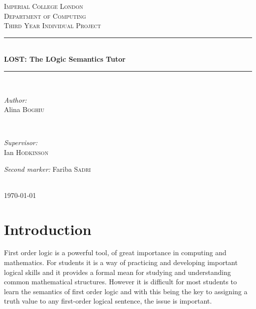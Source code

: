 \documentclass{article}
\begin{document}

\begin{titlepage}
\newcommand{\HRule}{\rule{\linewidth}{0.5mm}}
\center
\textsc{\LARGE Imperial College London}  \\[1.5cm]
\textsc{\Large Department of Computing}  \\[0.5cm]
\textsc{\large Third Year Individual Project} \\[0.5cm]

\HRule \\[0.6cm]
{\huge \bfseries LOST: The LOgic Semantics Tutor} \\[0.3cm]
\HRule \\[1.5cm]

\begin{minipage}{0.4\textwidth}

\begin{flushleft} \large \emph{Author:} \\
Alina  \textsc{Boghiu}
\end{flushleft}

\end{minipage}~
\begin{minipage}{0.4\textwidth}

\begin{flushright} \large \emph{Supervisor:} \\
Ian \textsc{Hodkinson}
\end{flushright}

\begin{flushright} \large \emph{Second marker:}
Fariba \textsc{Sadri}
\end{flushright}

\end{minipage}\\[4cm]

{\large \today}\\[3cm]
\vfill
\end{titlepage}


\section{Introduction}		%
First order logic is a powerful tool, of great importance in computing and mathematics. For students it is a way of practicing and developing important logical skills and it provides a formal mean for studying and understanding common mathematical structures. However it is difficult for most students to learn the semantics of first order logic and with this being the key to assigning a truth value to any first-order logical sentence, the issue is important.\\
\end{document}
